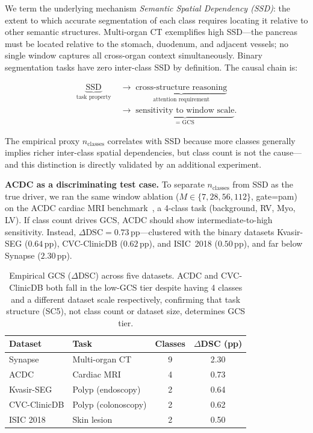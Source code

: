 We term the underlying mechanism \emph{Semantic Spatial Dependency (SSD)}: the extent to which accurate segmentation of each class requires locating it relative to other semantic structures. Multi-organ CT exemplifies high SSD---the pancreas must be located relative to the stomach, duodenum, and adjacent vessels; no single window captures all cross-organ context simultaneously. Binary segmentation tasks have zero inter-class SSD by definition. The causal chain is:

\begin{align*}
  \underbrace{\text{SSD}}_{\text{task property}}
  &\;\to\;
  \underbrace{\text{cross-structure reasoning}}_{\text{attention requirement}} \\
  &\;\to\;
  \underbrace{\text{sensitivity to window scale}}_{\text{= GCS}}.
\end{align*}

The empirical proxy $n_\text{classes}$ correlates with SSD because more classes generally implies richer inter-class spatial dependencies, but class count is not the cause---and this distinction is directly validated by an additional experiment.

\textbf{ACDC as a discriminating test case.} To separate $n_\text{classes}$ from SSD as the true driver, we ran the same window ablation ($M{\in}\{7,28,56,112\}$, gate=pam) on the ACDC cardiac MRI benchmark~\cite{bernard2018deep}, a 4-class task (background, RV, Myo, LV). If class count drives GCS, ACDC should show intermediate-to-high sensitivity. Instead, $\Delta\text{DSC}{=}0.73$\,pp---clustered with the binary datasets Kvasir-SEG ($0.64$\,pp), CVC-ClinicDB ($0.62$\,pp), and ISIC~2018 ($0.50$\,pp), and far below Synapse ($2.30$\,pp).

\begin{table}[tb]
  \caption{Empirical GCS ($\Delta$DSC) across five datasets. ACDC and CVC-ClinicDB both fall in the low-GCS tier despite having 4 classes and a different dataset scale respectively, confirming that task structure (SC5), not class count or dataset size, determines GCS tier.}
  \label{tab:gcs_spectrum}
  \centering
  \setlength{\tabcolsep}{6pt}
  \begin{tabular}{llcc}
    \toprule
    Dataset & Task & Classes & $\Delta$DSC (pp) \\
    \midrule
    Synapse      & Multi-organ CT      & 9 & 2.30 \\
    ACDC         & Cardiac MRI         & 4 & 0.73 \\
    Kvasir-SEG   & Polyp (endoscopy)   & 2 & 0.64 \\
    CVC-ClinicDB & Polyp (colonoscopy) & 2 & 0.62 \\
    ISIC 2018    & Skin lesion         & 2 & 0.50 \\
    \bottomrule
  \end{tabular}
\end{table}

